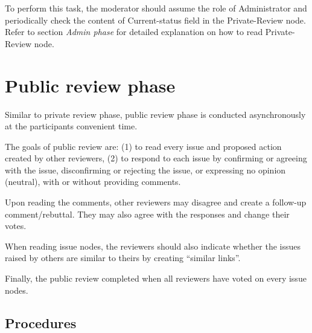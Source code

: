 To perform this task, the moderator should assume the role of
Administrator and periodically check the content of Current-status
field in the Private-Review node. Refer to section {\it Admin phase}
for detailed explanation on how to read Private-Review node.


\section {Public review phase}
Similar to private review phase, public review phase is conducted
asynchronously at the participants convenient time.

The goals of public review are: (1) to read every issue and proposed
action created by other reviewers, (2) to respond to each issue by
confirming or agreeing with the issue, disconfirming or rejecting the
issue, or expressing no opinion (neutral), with or without
providing comments.  

Upon reading the comments, other reviewers may
disagree and create a follow-up comment/rebuttal. They may also agree
with the responses and change their votes.

When reading issue nodes, the reviewers should also indicate
whether the issues raised by others are similar to theirs by creating
``similar links''.

Finally, the public review completed when all reviewers have voted on
every issue nodes.


\subsection{Procedures}
